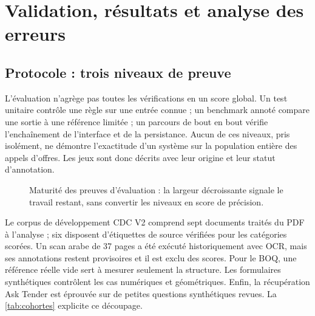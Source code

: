 \chapter{Validation, résultats et analyse des erreurs}\label{chap:evaluation}
\section{Protocole : trois niveaux de preuve}
L'évaluation n'agrège pas toutes les vérifications en un score global. Un test unitaire contrôle une règle sur une entrée connue ; un benchmark annoté compare une sortie à une référence limitée ; un parcours de bout en bout vérifie l'enchaînement de l'interface et de la persistance. Aucun de ces niveaux, pris isolément, ne démontre l'exactitude d'un système sur la population entière des appels d'offres. Les jeux sont donc décrits avec leur origine et leur statut d'annotation.

\begin{figure}[htbp]\centering
{}
\caption{Maturité des preuves d'évaluation : la largeur décroissante signale le travail restant, sans convertir les niveaux en score de précision.}\label{fig:maturite}
\end{figure}

Le corpus de développement CDC V2 comprend sept documents traités du PDF à l'analyse ; six disposent d'étiquettes de source vérifiées pour les catégories scorées. Un scan arabe de 37 pages a été exécuté historiquement avec OCR, mais ses annotations restent provisoires et il est exclu des scores. Pour le BOQ, une référence réelle vide sert à mesurer seulement la structure. Les formulaires synthétiques contrôlent les cas numériques et géométriques. Enfin, la récupération Ask Tender est éprouvée sur de petites questions synthétiques revues. La \autoref{tab:cohortes} explicite ce découpage.

